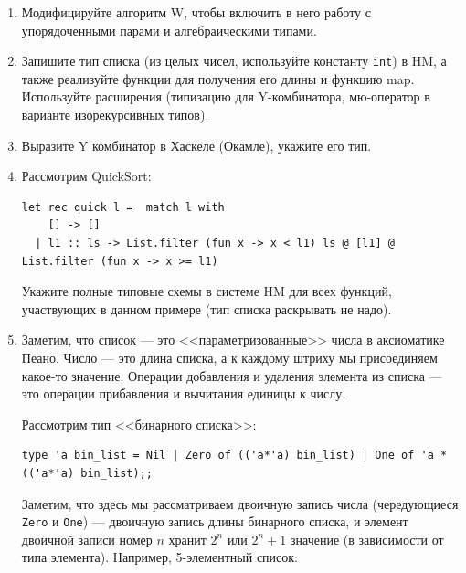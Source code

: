 \documentclass[10pt,a4paper,oneside]{article}
\begin{document}
\begin{enumerate}
\item Модифицируйте алгоритм W, чтобы включить в него работу с упорядоченными парами и алгебраическими типами.

\item Запишите тип списка (из целых чисел, используйте константу \texttt{int}) в HM, а также реализуйте функции для получения его длины и функцию map.
Используйте расширения (типизацию для Y-комбинатора, мю-оператор в варианте изорекурсивных типов).

\item Выразите Y комбинатор в Хаскеле (Окамле), укажите его тип.



\item Рассмотрим QuickSort:
\begin{verbatim}
let rec quick l =  match l with
    [] -> []
  | l1 :: ls -> List.filter (fun x -> x < l1) ls @ [l1] @ List.filter (fun x -> x >= l1)
\end{verbatim}

Укажите полные типовые схемы в системе HM для всех функций, участвующих в данном примере (тип списка раскрывать не надо).

\item Заметим, что список --- это <<параметризованные>> числа в 
аксиоматике Пеано. Число --- это длина списка, а к каждому штриху мы присоединяем какое-то значение.
Операции добавления и удаления элемента из списка --- это операции прибавления и вычитания
единицы к числу.

Рассмотрим тип <<бинарного списка>>:

\begin{verbatim}
type 'a bin_list = Nil | Zero of (('a*'a) bin_list) | One of 'a * (('a*'a) bin_list);;
\end{verbatim}

Заметим, что здесь мы рассматриваем двоичную запись числа (чередующиеся \verb!Zero! и \verb!One!) ---
двоичную запись длины бинарного списка, и элемент двоичной записи номер $n$ хранит $2^n$ или $2^n+1$ 
значение (в зависимости от типа элемента). Например, 5-элементный список:


\end{enumerate}
\end{document}
